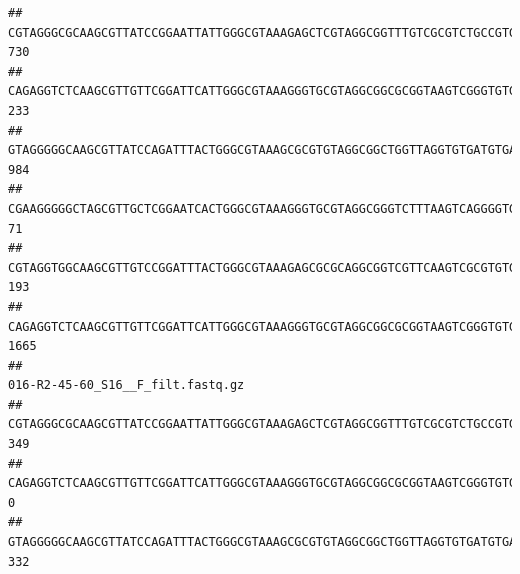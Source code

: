\documentclass[]{article}
\begin{document}
\begin{verbatim}
## CGTAGGGCGCAAGCGTTATCCGGAATTATTGGGCGTAAAGAGCTCGTAGGCGGTTTGTCGCGTCTGCCGTGAAAGTCCGGGGCTCAACTCCGGATCTGCGGTGGGTACGGGCAGACTAGAGTGATGTAGGGGAGACTGGAATTCCTGGTGTAGCGGTGAAATGCGCAGATATCAGGAGGAACACCGATGGCGAAGGCAGGTCTCTGGGCATTAACTGACGCTGAGGAGCGAAAGCATGGGGAGCGAACA                               730
## CAGAGGTCTCAAGCGTTGTTCGGATTCATTGGGCGTAAAGGGTGCGTAGGCGGCGCGGTAAGTCGGGTGTGAAATCTCGGAGCTTAACTCCGAAACTGCATTCGATACTGCCGTGCTTGAGGACTGGAGAGGAGACTGGAATTTACGGTGTAGCGGTGAAATGCGTAGATATCGTAAGGAAGACCAGTGGCGAAGGCGGGTCTCTGGACAGTTCCTGACGCTGAGGCACGAAGGCCAGGGGAGCAAACG                               233
## GTAGGGGGCAAGCGTTATCCAGATTTACTGGGCGTAAAGCGCGTGTAGGCGGCTGGTTAGGTGTGATGTGAAATCTTCCGGCTCAACCGGAAAACTGCATTGCAAACCGGCCTGGCTAGAGTGCAGGAGAGGGAAGCGGAATTCCAGGTGTAGCGGTGAAATGCGTAGATATCTGGAGGAACACCAGTGGCGAAGGCGGCTTCCTGGCCTGCAACTGACGCTGAGACGCGAAAGCGTGGGGAGCGAAC                                984
## CGAAGGGGGCTAGCGTTGCTCGGAATCACTGGGCGTAAAGGGTGCGTAGGCGGGTCTTTAAGTCAGGGGTGAAATCCTGGAGCTCAACTCCAGAACTGCCTTTGATACTGAAGATCTTGAGTTCGGGAGAGGTGAGTGGAACTGCGAGTGTAGAGGTGAAATTCGTAGATATTCGCAAGAACACCAGTGGCGAAGGCGGCTCACTGGCCCGATACTGACGCTGAGGCACGAAAGCGTGGGGAGCAAACA                                71
## CGTAGGTGGCAAGCGTTGTCCGGATTTACTGGGCGTAAAGAGCGCGCAGGCGGTCGTTCAAGTCGCGTGTGAAAGCCCCCGGCTCAACTGGGGAGGGTCACGCGATACTGATCGACTCGAAGGCAGGAGAGGGTAGTGGAATTCCCGGTGTAGTGGTGAAATGCGTAGATATCGGGAGGAACACCAGTGGCGAAGGCGACTACCTGGCCTGTTCTTGACGCTGAGGCGCGAAAGCTAGGGGAGCAAACG                               193
## CAGAGGTCTCAAGCGTTGTTCGGATTCATTGGGCGTAAAGGGTGCGTAGGCGGCGCGGTAAGTCGGGTGTGAAATCTCGGGGCTTAACTCCGAAACTGCATTCGATACTGCCGTGCTTGAGGACTGGAGAGGAGACTGGAATTTACGGTGTAGCGGTGAAATGCGTAGATATCGTAAGGAAGACCAGTGGCGAAGGCGGGTCTCTGGACAGTTCCTGACGCTGAGGCACGAAGGCCAGGGGAGCAAACG                              1665
##                                                                                                                                                                                                                                                           016-R2-45-60_S16__F_filt.fastq.gz
## CGTAGGGCGCAAGCGTTATCCGGAATTATTGGGCGTAAAGAGCTCGTAGGCGGTTTGTCGCGTCTGCCGTGAAAGTCCGGGGCTCAACTCCGGATCTGCGGTGGGTACGGGCAGACTAGAGTGATGTAGGGGAGACTGGAATTCCTGGTGTAGCGGTGAAATGCGCAGATATCAGGAGGAACACCGATGGCGAAGGCAGGTCTCTGGGCATTAACTGACGCTGAGGAGCGAAAGCATGGGGAGCGAACA                               349
## CAGAGGTCTCAAGCGTTGTTCGGATTCATTGGGCGTAAAGGGTGCGTAGGCGGCGCGGTAAGTCGGGTGTGAAATCTCGGAGCTTAACTCCGAAACTGCATTCGATACTGCCGTGCTTGAGGACTGGAGAGGAGACTGGAATTTACGGTGTAGCGGTGAAATGCGTAGATATCGTAAGGAAGACCAGTGGCGAAGGCGGGTCTCTGGACAGTTCCTGACGCTGAGGCACGAAGGCCAGGGGAGCAAACG                                 0
## GTAGGGGGCAAGCGTTATCCAGATTTACTGGGCGTAAAGCGCGTGTAGGCGGCTGGTTAGGTGTGATGTGAAATCTTCCGGCTCAACCGGAAAACTGCATTGCAAACCGGCCTGGCTAGAGTGCAGGAGAGGGAAGCGGAATTCCAGGTGTAGCGGTGAAATGCGTAGATATCTGGAGGAACACCAGTGGCGAAGGCGGCTTCCTGGCCTGCAACTGACGCTGAGACGCGAAAGCGTGGGGAGCGAAC                                332

\end{verbatim}
\end{document}
